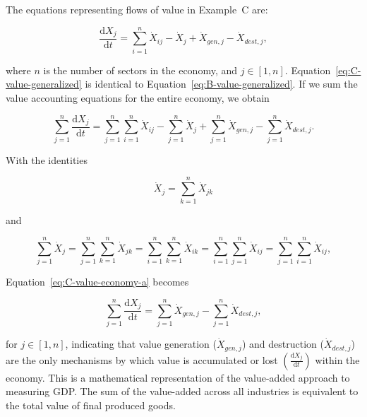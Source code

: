 The equations representing flows of value in Example~C are:

\begin{equation}\label{eq:C-value-generalized}
	\frac{\mathrm{d}X_{j}}{\mathrm{d}t}
	= \sum\limits_{i=1}^{n} \dot{X}_{ij}
	- \dot{X}_{j}
	+ \dot{X}_{gen,j}
	- \dot{X}_{dest,j},
\end{equation}

\noindent{}where $n$ is the number of sectors in the economy, and $j \in [1, n]$.
Equation~\ref{eq:C-value-generalized} is identical to Equation~\ref{eq:B-value-generalized}.
If we sum the value accounting equations for the entire economy, 
we obtain

\begin{equation}\label{eq:C-value-economy-a}
	\sum\limits_{j=1}^{n} \frac{\mathrm{d}X_{j}}{\mathrm{d}t}
	= \sum\limits_{j=1}^{n} \sum\limits_{i=1}^{n} \dot{X}_{ij}
	- \sum\limits_{j=1}^{n} \dot{X}_{j}
	+ \sum\limits_{j=1}^{n} \dot{X}_{gen,j}
	- \sum\limits_{j=1}^{n} \dot{X}_{dest,j}.
\end{equation}

\noindent{}With the identities

\begin{equation} \label{eq:X_identity_1}
	\dot{X}_{j}  
	= \sum\limits_{k=1}^n \dot{X}_{jk}
\end{equation}

\noindent{}and

\begin{equation} \label{eq:X_identity_2}
	\sum\limits_{j=1}^n\dot{X}_{j}  
	= \sum\limits_{j=1}^n \sum\limits_{k=1}^n \dot{X}_{jk}
	= \sum\limits_{i=1}^n \sum\limits_{k=1}^n \dot{X}_{ik}
	= \sum\limits_{i=1}^n \sum\limits_{j=1}^n \dot{X}_{ij}
	= \sum\limits_{j=1}^n \sum\limits_{i=1}^n \dot{X}_{ij},
\end{equation}

\noindent{}Equation~\ref{eq:C-value-economy-a} becomes

\begin{equation}\label{eq:C-value-economy-b}
	\sum\limits_{j=1}^{n} \frac{\mathrm{d}X_{j}}{\mathrm{d}t}
	= \sum\limits_{j=1}^{n} \dot{X}_{gen,j}
	- \sum\limits_{j=1}^{n} \dot{X}_{dest,j},
\end{equation}

\noindent{}for $j \in [1, n]$, indicating that 
value generation ($\dot{X}_{gen,j}$) 
and destruction ($\dot{X}_{dest,j}$)
are the only mechanisms by which value is accumulated or lost
$\left( \frac{\mathrm{d}X_{j}}{\mathrm{d}t} \right)$
within the economy.  This is a mathematical representation of the
value-added approach to measuring GDP\@. The sum of the
value-added across all industries is equivalent to the 
total value of final produced goods.\cite[p.~196]{Landefeld:2008aa}


